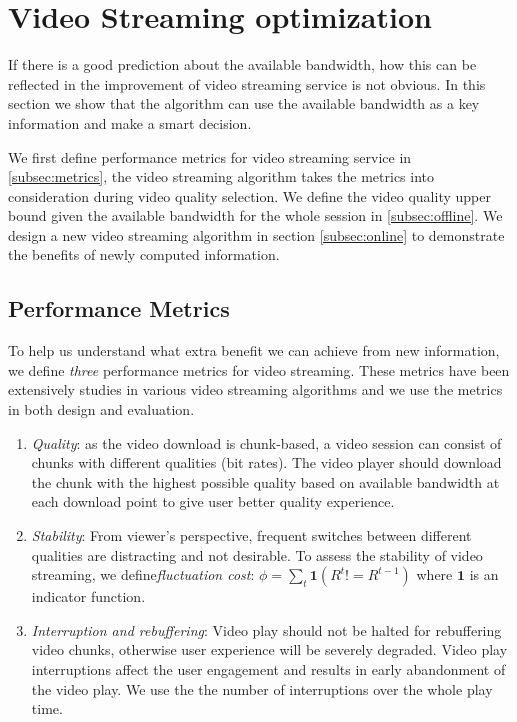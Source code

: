 
\section{Video Streaming optimization}\label{sec:optimization}



If there is a good prediction about the available bandwidth, how this can be reflected in the improvement of video streaming service is not obvious. In this section we show that the algorithm can use the available bandwidth as a key information and make a smart decision. 

We first define performance metrics for video streaming service in \autoref{subsec:metrics}, the video streaming algorithm takes the metrics into consideration during video quality selection. We define the video quality upper bound given the available bandwidth for the whole session in \autoref{subsec:offline}. We design a new video streaming algorithm in section \ref{subsec:online} to demonstrate the benefits of newly computed information.


\subsection{Performance Metrics}\label{subsec:metrics}
To help us understand what extra benefit we can achieve from new information, we define \emph{three} performance metrics for video streaming. These metrics have been extensively studies in various video streaming algorithms and we use the metrics in both design and evaluation\cite{Qava, Avis,VideoMeasurement, Festive}.

\begin{enumerate}
\item\textit{Quality}: as the video download is chunk-based, a video session can consist of chunks with different qualities (bit rates). The video player should download the chunk with the highest possible quality based on available bandwidth at each download point to give user better quality experience. 

\item\textit{Stability}: From viewer's perspective, frequent switches between different qualities are distracting and not desirable. To assess the stability of video streaming, we define\emph{fluctuation cost}: $\phi= \sum\limits_t \mathbf{1}(R^t!=R^{t-1})$ where $\mathbf{1}$ is an indicator function.

\item\textit{Interruption and rebuffering}: Video play should not be halted for rebuffering video chunks, otherwise user experience will be severely degraded. Video play interruptions affect the user engagement and results in early abandonment of the video play. We use the the number of interruptions over the whole play time.
\end{enumerate}

